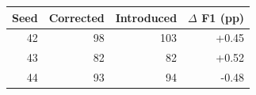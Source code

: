 \begin{tabular}{rrrr}
\toprule
Seed & Corrected & Introduced & $\Delta$ F1 (pp) \\
\midrule
42 & 98 & 103 & +0.45 \\
43 & 82 & 82 & +0.52 \\
44 & 93 & 94 & -0.48 \\
\bottomrule
\end{tabular}
